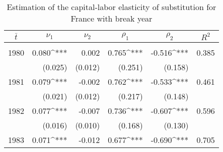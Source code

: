 \begingroup
\renewcommand{\arraystretch}{1}
\begin{table}[tb]
	\caption{Estimation of the capital-labor elasticity of substitution for France with break year}\label{tab:break}
	\centering
	\begin{threeparttable}
		\begin{tabular}{c D{.}{.}{-3} D{.}{.}{-3} D{.}{.}{-3} D{.}{.}{-3} D{.}{.}{-3}}
			$\bar{t}$ 	&  &  &  &  &  \\ \hline \hline \\ [-1ex]
			1980		& 0.080^{***}	& 0.002			& 0.765^{***}	& -0.516^{***}	& 0.385 \\
						& (0.025)		& (0.012)		& (0.251)		& (0.158)		& \\
			1981		& 0.079^{***}	& -0.002		& 0.762^{***}	& -0.533^{***}	& 0.461 \\
						& (0.021)		& (0.012)		& (0.217)		& (0.148)		& \\
			1982		& 0.077^{***}	& -0.007		& 0.736^{***}	& -0.607^{***}	& 0.596 \\
						& (0.016)		& (0.010)		& (0.168)		& (0.130)		& \\
			1983		& 0.071^{***}	& -0.012		& 0.677^{***}	& -0.690^{***}	& 0.705 \\

\end{tabular}
\end{threeparttable}
\end{table}
